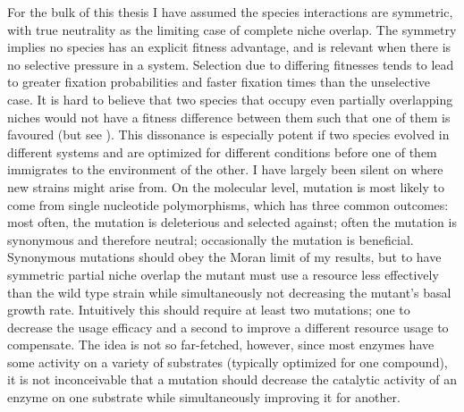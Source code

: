 For the bulk of this thesis I have assumed the species interactions are symmetric, with true neutrality as the limiting case of complete niche overlap. 
The symmetry implies no species has an explicit fitness advantage, and is relevant when there is no selective pressure in a system. 
Selection due to differing fitnesses tends to lead to greater fixation probabilities and faster fixation times than the unselective case. 
It is hard to believe that two species that occupy even partially overlapping niches would not have a fitness difference between them such that one of them is favoured (but see \cite{Hubbell2006,Rosindell2011}). %
This dissonance is especially potent if two species evolved in different systems and are optimized for different conditions before one of them immigrates to the environment of the other. 
I have largely been silent on where new strains might arise from. 
On the molecular level, mutation is most likely to come from single nucleotide polymorphisms, which has three common outcomes: most often, the mutation is deleterious and selected against; often the mutation is synonymous and therefore neutral; occasionally the mutation is beneficial. 
Synonymous mutations should obey the Moran limit of my results, but to have symmetric partial niche overlap the mutant must use a resource less effectively than the wild type strain while simultaneously not decreasing the mutant's basal growth rate. 
Intuitively this should require at least two mutations; one to decrease the usage efficacy and a second to improve a different resource usage to compensate. 
The idea is not so far-fetched, however, since most enzymes have some activity on a variety of substrates (typically optimized for one compound), it is not inconceivable that a mutation should decrease the catalytic activity of an enzyme on one substrate while simultaneously improving it for another. 


